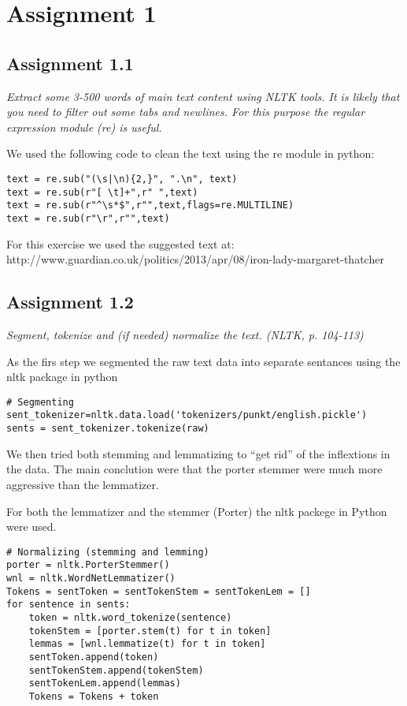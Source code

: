 \documentclass[a4paper]{article}
\begin{document}
\section{Assignment 1}

\subsection{Assignment 1.1}
\textit{Extract some 3-500 words of main text content using NLTK tools. It is
likely that you need to filter out some tabs and newlines. For this
purpose the regular expression module (re) is useful.}

We used the following code to clean the text using the re module in python:
\begin{verbatim}
text = re.sub("(\s|\n){2,}", ".\n", text)
text = re.sub(r"[ \t]+",r" ",text)
text = re.sub(r"^\s*$",r"",text,flags=re.MULTILINE)
text = re.sub(r"\r",r"",text)
\end{verbatim} 

For this exercise we used the suggested text at:
http://www.guardian.co.uk/politics/2013/apr/08/iron-lady-margaret-thatcher


\subsection{Assignment 1.2}
\textit{Segment, tokenize and (if needed) normalize the text. (NLTK, p. 104-113)}

As the firs step we segmented the raw text data into separate
sentances using the nltk package in python
\begin{verbatim}
# Segmenting
sent_tokenizer=nltk.data.load('tokenizers/punkt/english.pickle')
sents = sent_tokenizer.tokenize(raw)
\end{verbatim} 

We then tried both stemming and lemmatizing to ``get rid'' of the
inflextions in the data. The main conclution were that the porter
stemmer were much more aggressive than the lemmatizer. 

For both the lemmatizer and the stemmer (Porter) the nltk packege in
Python were used.

\begin{verbatim}
# Normalizing (stemming and lemming)
porter = nltk.PorterStemmer()
wnl = nltk.WordNetLemmatizer()
Tokens = sentToken = sentTokenStem = sentTokenLem = []
for sentence in sents:
    token = nltk.word_tokenize(sentence)
    tokenStem = [porter.stem(t) for t in token]
    lemmas = [wnl.lemmatize(t) for t in token]
    sentToken.append(token)
    sentTokenStem.append(tokenStem)
    sentTokenLem.append(lemmas)
    Tokens = Tokens + token
\end{verbatim} 
\end{document}
